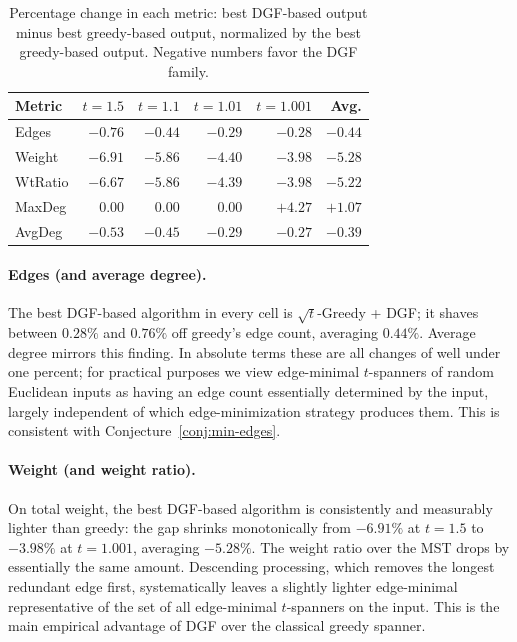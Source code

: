 \documentclass{cccg26}
\begin{document}
\begin{table}[h]
    \centering
    \small
    \begin{tabular}{lrrrrr}
        \toprule
        Metric  & $t=1.5$ & $t=1.1$ & $t=1.01$ & $t=1.001$ & Avg. \\
        \midrule
        Edges   & $-0.76$ & $-0.44$ & $-0.29$ & $-0.28$ & $-0.44$ \\
        Weight  & $-6.91$ & $-5.86$ & $-4.40$ & $-3.98$ & $-5.28$ \\
        WtRatio & $-6.67$ & $-5.86$ & $-4.39$ & $-3.98$ & $-5.22$ \\
        MaxDeg  & $0.00$  & $0.00$  & $0.00$  & $+4.27$ & $+1.07$ \\
        AvgDeg  & $-0.53$ & $-0.45$ & $-0.29$ & $-0.27$ & $-0.39$ \\
        \bottomrule
    \end{tabular}
    \caption{Percentage change in each metric: best DGF-based output
    minus best greedy-based output, normalized by the best
    greedy-based output. Negative numbers favor the DGF family.}
    \label{tab:summary-percent}
\end{table}

\paragraph{Edges (and average degree).}
The best DGF-based algorithm in every cell is $\sqrt{t}$-Greedy +
DGF; it shaves between $0.28\%$ and $0.76\%$ off greedy's edge
count, averaging $0.44\%$. Average degree mirrors this finding. In
absolute terms these are all changes of well under one percent; for
practical purposes we view edge-minimal $t$-spanners of random
Euclidean inputs as having an edge count essentially determined by
the input, largely independent of which edge-minimization strategy
produces them. This is consistent with
Conjecture~\ref{conj:min-edges}.

\paragraph{Weight (and weight ratio).}
On total weight, the best DGF-based algorithm is consistently and
measurably lighter than greedy: the gap shrinks monotonically from
$-6.91\%$ at $t=1.5$ to $-3.98\%$ at $t=1.001$, averaging $-5.28\%$.
The weight ratio over the MST drops by essentially the same amount.
Descending processing, which removes the longest redundant edge
first, systematically leaves a slightly lighter edge-minimal
representative of the set of all edge-minimal $t$-spanners on the
input. This is the main empirical advantage of DGF over the
classical greedy spanner.
\end{document}
